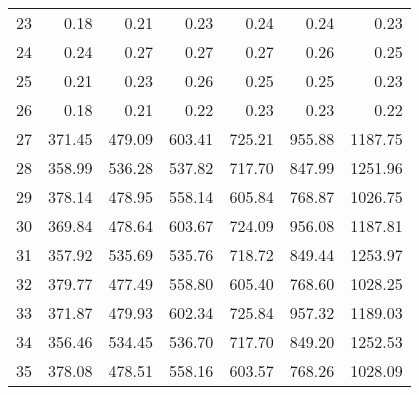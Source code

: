 \begin{tabular}{lrrrrrr}
23 &    0.18 &    0.21 &    0.23 &    0.24 &    0.24 &     0.23 \\
24 &    0.24 &    0.27 &    0.27 &    0.27 &    0.26 &     0.25 \\
25 &    0.21 &    0.23 &    0.26 &    0.25 &    0.25 &     0.23 \\
26 &    0.18 &    0.21 &    0.22 &    0.23 &    0.23 &     0.22 \\
27 &  371.45 &  479.09 &  603.41 &  725.21 &  955.88 &  1187.75 \\
28 &  358.99 &  536.28 &  537.82 &  717.70 &  847.99 &  1251.96 \\
29 &  378.14 &  478.95 &  558.14 &  605.84 &  768.87 &  1026.75 \\
30 &  369.84 &  478.64 &  603.67 &  724.09 &  956.08 &  1187.81 \\
31 &  357.92 &  535.69 &  535.76 &  718.72 &  849.44 &  1253.97 \\
32 &  379.77 &  477.49 &  558.80 &  605.40 &  768.60 &  1028.25 \\
33 &  371.87 &  479.93 &  602.34 &  725.84 &  957.32 &  1189.03 \\
34 &  356.46 &  534.45 &  536.70 &  717.70 &  849.20 &  1252.53 \\
35 &  378.08 &  478.51 &  558.16 &  603.57 &  768.26 &  1028.09 \\
\bottomrule
\end{tabular}
